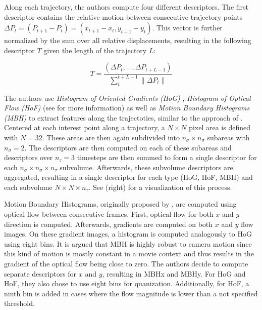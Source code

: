 Along each trajectory, the authors compute four different descriptors.
The first descriptor contains the relative motion between consecutive trajectory points $\Delta P_t = (P_{t+1} - P_t) = (x_{t+1} - x_t, y_{t+1} - y_t)$.
This vector is further normalized by the sum over all relative displacements, resulting in the following descriptor $T$ given the length of the trajectory $L$:

\begin{equation}
    T = \frac{(\Delta P_t, \dots, \Delta P_{t + L -1})}{\sum_t^{t+L-1} \lVert \Delta P_t \rVert}
\end{equation}

The authors use \textit{Histogram of Oriented Gradients (HoG)} \cite{dalal_histograms_2005}, \textit{Histogram of Optical Flow (HoF)} \cite{laptev_learning_2008} (see  for more information) as well as \textit{Motion Boundary Histograms (MBH)} \cite{dalal_human_2006} to extract features along the trajectoties, similar to the approach of \cite{laptev_learning_2008} .
Centered at each interest point along a trajectory, a $N \times N$ pixel area is defined with $N = 32$.
These areas are then again subdivided into $n_\sigma \times n_\sigma$ subareas with $n_\sigma = 2$.
The descriptors are then computed on each of these subareas and descriptors over $n_\tau = 3$ timesteps are then summed to form a single descriptor for each $n_\sigma \times n_\sigma \times n_\tau$ subvolume.
Afterwards, these subvolume descriptors are aggregated, resulting in a single descriptor for each type (HoG, HoF, MBH) and each subvolume $N \times N \times n_\tau$.
See  (right) for a visualization of this process.

Motion Boundary Histograms, originally proposed by \cite{dalal_human_2006}, are computed using optical flow between consecutive frames.
First, optical flow for both $x$ and $y$ direction is computed.
Afterwards, gradients are computed on both $x$ and $y$ flow images.
On these gradient images, a histogram is computed analogously to HoG using eight bins.
It is argued that MBH is highly robust to camera motion since this kind of motion is mostly constant in a movie context and thus results in the gradient of the optical flow being close to zero. 
The authors decide to compute separate descriptors for $x$ and $y$, resulting in MBHx and MBHy.
For HoG and HoF, they also chose to use eight bins for quanization.
Additionally, for HoF, a ninth bin is added in cases where the flow magnitude is lower than a not specified threshold.


